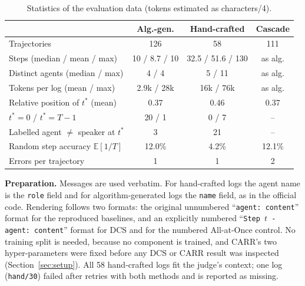 \documentclass[conference]{IEEEtran}
\begin{document}
\begin{table}[t]
\centering
\caption{Statistics of the evaluation data (tokens estimated as characters/4).}
\label{tab:data}
\footnotesize
\setlength{\tabcolsep}{3pt}
\begin{tabular}{@{}lccc@{}}
\toprule
 & Alg.-gen. & Hand-crafted & Cascade \\
\midrule
Trajectories & 126 & 58 & 111 \\
Steps (median / mean / max) & 10 / 8.7 / 10 & 32.5 / 51.6 / 130 & as alg. \\
Distinct agents (median / max) & 4 / 4 & 5 / 11 & as alg. \\
Tokens per log (mean / max) & 2.9k / 28k & 16k / 76k & as alg. \\
Relative position of $t^*$ (mean) & 0.37 & 0.46 & 0.37 \\
$t^*=0$ / $t^*=T{-}1$ & 20 / 1 & 0 / 7 & -- \\
Labelled agent $\ne$ speaker at $t^*$ & 3 & 21 & -- \\
Random step accuracy $\mathbb{E}[1/T]$ & 12.0\% & 4.2\% & 12.1\% \\
Errors per trajectory & 1 & 1 & 2 \\
\bottomrule
\end{tabular}
\end{table}

\textbf{Preparation.} Messages are used verbatim. For hand-crafted logs the agent name is the \texttt{role} field and for algorithm-generated logs the \texttt{name} field, as in the official code. Rendering follows two formats: the original unnumbered ``\texttt{agent: content}'' format for the reproduced baselines, and an explicitly numbered ``\texttt{Step $t$ - agent: content}'' format for DCS and for the numbered All-at-Once control. No training split is needed, because no component is trained, and CARR's two hyper-parameters were fixed before any DCS or CARR result was inspected (Section~\ref{sec:setup}). All 58 hand-crafted logs fit the judge's context; one log (\texttt{hand/30}) failed after retries with both methods and is reported as missing.
\end{document}
